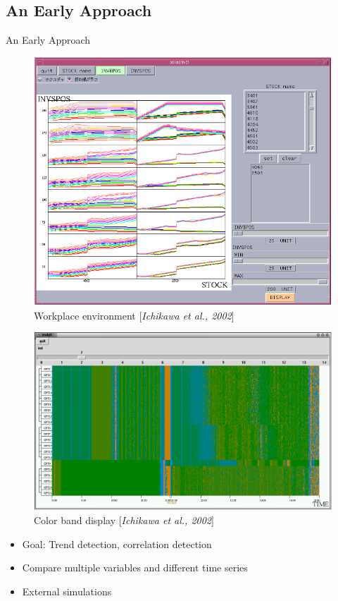 \documentclass[10pt]{beamer}
\begin{document}
\subsection{An Early Approach}
\begin{frame}{An Early Approach}
	\centering	
	\begin{minipage}[t]{0.475\textwidth}
		\begin{figure}[htbp]
			\includegraphics[width=\textwidth]{images/workplace}
			\caption{Workplace environment [\textit{Ichikawa et al., 2002}]}
		\end{figure}
	\end{minipage}
	\hfill
	\begin{minipage}[t]{0.475\textwidth}
		\begin{figure}[htbp]
			\includegraphics[width=\textwidth]{images/color-band}
			\caption{Color band display [\textit{Ichikawa et al., 2002}]}
		\end{figure}
	\end{minipage}	
	\begin{itemize}
		\item Goal: Trend detection, correlation detection
		\item Compare multiple variables and different time series
		\item External simulations
	\end{itemize}
\end{frame}
\end{document}
